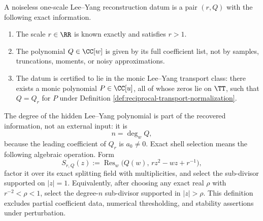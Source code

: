 \begin{definition}\label{def:noiseless-leyang-reconstruction-data}
A noiseless one-scale Lee--Yang reconstruction datum is a pair \((r,Q)\) with the following exact information.
\begin{enumerate}[label=\textup{(\roman*)}]
  \item The scale \(r\in\RR\) is known exactly and satisfies \(r>1\).
  \item The polynomial \(Q\in\CC[w]\) is given by its full coefficient list, not by samples, truncations, moments, or noisy approximations.
  \item The datum is certified to lie in the monic Lee--Yang transport class: there exists a monic polynomial \(P\in\CC[u]\), all of whose zeros lie on \(\TT\), such that \(Q=Q_r\) for \(P\) under Definition \ref{def:reciprocal-transport-normalization}.
\end{enumerate}
The degree of the hidden Lee--Yang polynomial is part of the recovered information, not an external input: it is
\[
n=\deg_w Q,
\]
because the leading coefficient of \(Q_r\) is \(a_0\ne0\).  Exact shell selection means the following algebraic operation.  Form
\[
S_{r,Q}(z):=\operatorname{Res}_w\!\bigl(Q(w),\,r z^2-w z+r^{-1}\bigr),
\]
factor it over its exact splitting field with multiplicities, and select the sub-divisor supported on \(|z|=1\).  Equivalently, after choosing any exact real \(\rho\) with \(r^{-2}<\rho<1\), select the degree-\(n\) sub-divisor supported in \(|z|>\rho\).  This definition excludes partial coefficient data, numerical thresholding, and stability assertions under perturbation.
\end{definition}

